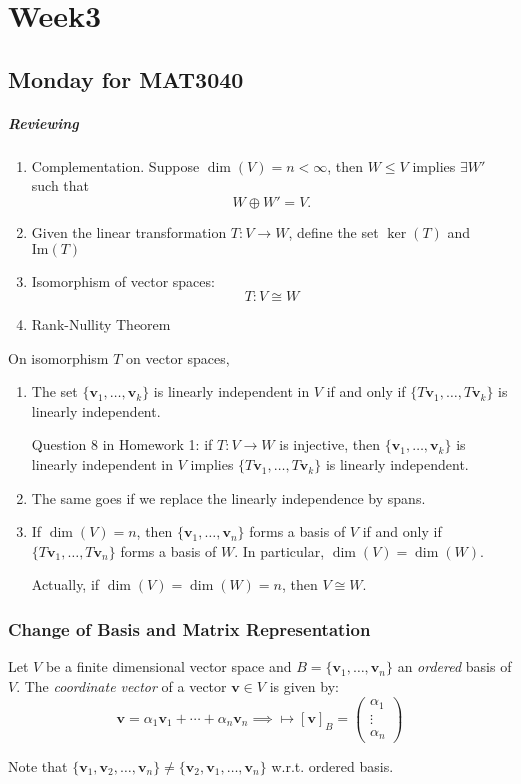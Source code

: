
\chapter{Week3}
\section{Monday for MAT3040}
\paragraph{Reviewing}
\begin{enumerate}
\item
Complementation. Suppose $\dim(V)=n<\infty$, then $W\le V$ implies $\exists W'$ such that
\[
W\oplus W'=V.
\]
\item
Given the linear transformation $T:V\to W$, define the set  $\ker(T)$ and $\text{Im}(T)$
\item
Isomorphism of vector spaces:
\[
T:V\cong W
\]
\item
Rank-Nullity Theorem
\end{enumerate}
\begin{remark}
On isomorphism $T$ on vector spaces,
\begin{enumerate}
\item
The set $\{\bm v_1,\dots,\bm v_k\}$ is linearly independent in $V$ if and only if $\{T\bm v_1,\dots,T\bm v_k\}$ is linearly independent.

Question 8 in Homework 1: if $T:V\to W$ is injective, then $\{\bm v_1,\dots,\bm v_k\}$ is linearly independent in $V$ implies $\{T\bm v_1,\dots,T\bm v_k\}$ is linearly independent.
\item
The same goes if we replace the linearly independence by spans.
\item
If $\dim(V)=n$, then $\{\bm v_1,\dots,\bm v_n\}$ forms a basis of $V$ if and only if $\{T\bm v_1,\dots,T\bm v_n\}$ forms a basis of $W$. In particular, $\dim(V)=\dim(W)$.

Actually, if $\dim(V)=\dim(W)=n$, then $V\cong W$.
\end{enumerate}
\end{remark}

\subsection{Change of Basis and Matrix Representation}

\begin{definition}
Let $V$ be a finite dimensional vector space and $B=\{\bm v_1,\dots,\bm v_n\}$ an \emph{ordered} basis of $V$. The \emph{coordinate vector} of a vector $\bm v\in V$ is given by:
\[
\bm v=\alpha_1\bm v_1+\cdots+\alpha_n\bm v_n
\implies
\mapsto [\bm v]_B=\begin{pmatrix}
\alpha_1\\\vdots\\\alpha_n
\end{pmatrix}
\]
\end{definition}
Note that $\{\bm v_1,\bm v_2,\dots,\bm v_n\}\ne\{\bm v_2,\bm v_1,\dots,\bm v_n\}$ w.r.t. ordered basis.

